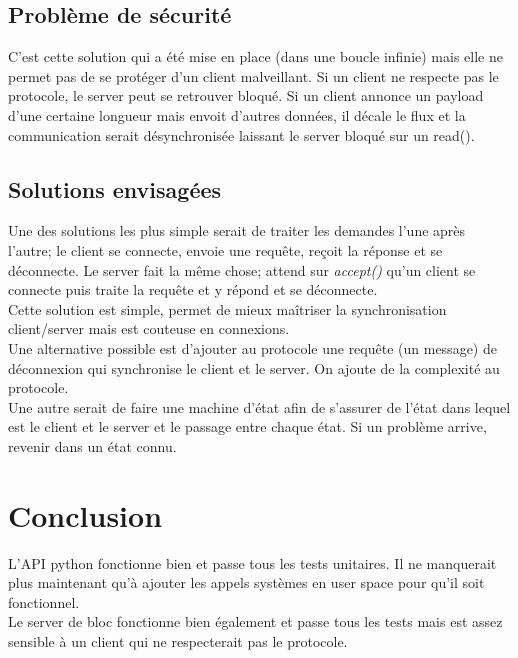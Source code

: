 \documentclass[a4paper,12pt]{article}
\begin{document}
\subsection{Problème de sécurité}

C'est cette solution qui a été mise en place (dans une boucle infinie) mais elle ne permet pas de se protéger d'un client malveillant. Si un client ne respecte pas le protocole, le server peut se retrouver bloqué. Si un client annonce un payload d'une certaine longueur mais envoit d'autres données, il décale le flux et la communication serait désynchronisée laissant le server bloqué sur un read().\\


\subsection*{Solutions envisagées}

Une des solutions les plus simple serait de traiter les demandes l'une après l'autre; le client se connecte, envoie une requête, reçoit la réponse et se déconnecte. Le server fait la même chose; attend sur \emph{accept()} qu'un client se connecte puis traite la requête et y répond et se déconnecte.\\

Cette solution est simple, permet de mieux maîtriser la synchronisation  client/server mais est couteuse en connexions.\\


Une alternative possible est d'ajouter au protocole une requête (un message) de déconnexion qui synchronise le client et le server. On ajoute de la complexité au protocole.\\

Une autre serait de faire une machine d'état afin de s'assurer de l'état dans lequel est le client et le server et le passage entre chaque état. Si un problème arrive, revenir dans un état connu.


\section{Conclusion}

L'API python fonctionne bien et passe tous les tests unitaires. Il ne manquerait plus maintenant qu'à ajouter les appels systèmes en user space pour qu'il soit fonctionnel.\\

Le server de bloc fonctionne bien également et passe tous les tests mais est assez sensible à un client qui ne respecterait pas le protocole.\\
\end{document}
